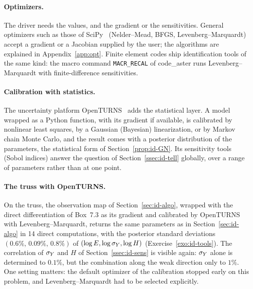 \paragraph{Optimizers.}
The driver needs the values, and the gradient or the sensitivities. General
optimizers such as those of SciPy~\cite{VirtanenEtAl2020} (Nelder--Mead, BFGS,
Levenberg--Marquardt) accept a gradient or a Jacobian supplied by the user; the
algorithms are explained in Appendix~\ref{app:opt}. Finite element codes ship
identification tools of the same kind: the macro command \texttt{MACR\_RECAL} of
code\_aster runs Levenberg--Marquardt with finite-difference sensitivities.

\paragraph{Calibration with statistics.}
The uncertainty platform OpenTURNS~\cite{BaudinEtAl2017} adds the statistical
layer. A model wrapped as a Python function, with its gradient if available, is
calibrated by nonlinear least squares, by a Gaussian (Bayesian) linearization, or
by Markov chain Monte Carlo, and the result comes with a posterior distribution of
the parameters, the statistical form of Section~\ref{prop:id-GN}. Its sensitivity
tools (Sobol indices) answer the question of Section~\ref{ssec:id-tell} globally,
over a range of parameters rather than at one point.

\paragraph{The truss with OpenTURNS.}
On the truss, the observation map of Section~\ref{sec:id-algo}, wrapped with the
direct differentiation of Box~7.3 as its gradient and calibrated by OpenTURNS with
Levenberg--Marquardt, returns the same parameters as in Section~\ref{sec:id-algo}
in 14 direct computations, with the posterior standard deviations
$(0.6\%,\,0.09\%,\,0.8\%)$ of $(\log E,\log\sigma_{Y},\log H)$ (Exercise~\ref{exo:id-tools}).
The correlation of $\sigma_{Y}$ and $H$ of Section~\ref{ssec:id-sens} is visible again:
$\sigma_{Y}$ alone is determined to $0.1\%$, but the combination along the weak
direction only to $1\%$. One setting matters: the default optimizer of the
calibration stopped early on this problem, and Levenberg--Marquardt had to be
selected explicitly.

